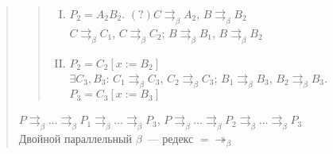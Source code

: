 \documentclass{article}
\begin{document}
\begin{quote}
\begin{quote}
\begin{itemize}
\begin{enumerate}[(I)]
					\item $P_2 = A_2B_2$. $(?)C \rightrightarrows_{\beta} A_2$, $B \rightrightarrows_{\beta} B_2$ \\
					$C \rightrightarrows_{\beta} C_1$, $C \rightrightarrows_{\beta} C_2$; $B \rightrightarrows_{\beta} B_1$, $B \rightrightarrows_{\beta} B_2$
					\item $P_2 = C_2 [x := B_2]$ \\
					$\exists C_3, B_3$: $C_1 \rightrightarrows_{\beta} C_3$, $C_2 \rightrightarrows_{\beta} C_3$; $B_1 \rightrightarrows_{\beta} B_3$, $B_2 \rightrightarrows_{\beta} B_3$. $P_3 = C_3 [x := B_3]$
				\end{enumerate}
			\end{itemize}
		\end{quote}
		$P \rightrightarrows_{\beta} \dots \rightrightarrows_{\beta} P_1 \rightrightarrows_{\beta} \dots \rightrightarrows_{\beta} P_3$, $P \rightrightarrows_{\beta} \dots \rightrightarrows_{\beta} P_2 \rightrightarrows_{\beta} \dots \rightrightarrows_{\beta} P_3$ \\
		Двойной параллельный $\beta$~--- редекс $= \twoheadrightarrow_{\beta}$
	\end{quote}
\end{document}
